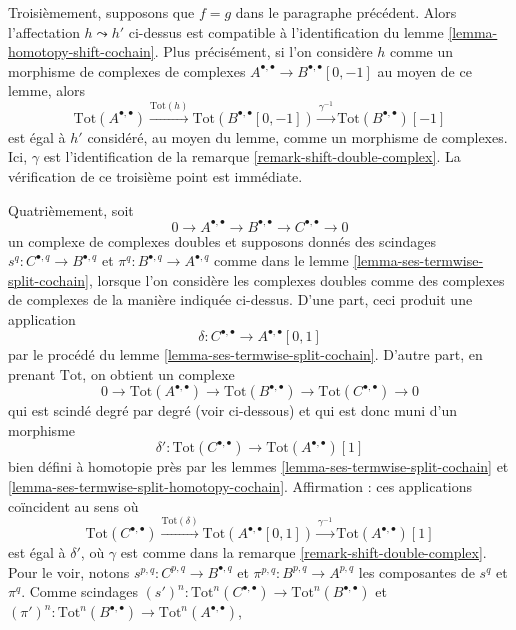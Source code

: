 \begin{remark}
\medskip\noindent
Troisièmement, supposons que $f = g$ dans le paragraphe précédent.
Alors l'affectation $h \leadsto h'$ ci-dessus est compatible à
l'identification du lemme \ref{lemma-homotopy-shift-cochain}.
Plus précisément, si l'on considère $h$ comme un morphisme de complexes
de complexes $A^{\bullet, \bullet} \to B^{\bullet, \bullet}[0, -1]$
au moyen de ce lemme, alors
$$
\text{Tot}(A^{\bullet, \bullet})
\xrightarrow{\text{Tot}(h)}
\text{Tot}(B^{\bullet, \bullet}[0, -1])
\xrightarrow{\gamma^{-1}}
\text{Tot}(B^{\bullet, \bullet})[-1]
$$
est égal à $h'$ considéré, au moyen du lemme, comme un morphisme de complexes.
Ici, $\gamma$ est l'identification de la
remarque \ref{remark-shift-double-complex}.
La vérification de ce troisième point est immédiate.

\medskip\noindent
Quatrièmement, soit
$$
0 \to A^{\bullet, \bullet} \to B^{\bullet, \bullet} \to
C^{\bullet, \bullet} \to 0
$$
un complexe de complexes doubles et supposons donnés des scindages
$s^q : C^{\bullet, q} \to B^{\bullet, q}$ et
$\pi^q : B^{\bullet, q} \to A^{\bullet, q}$
comme dans le lemme \ref{lemma-ses-termwise-split-cochain},
lorsque l'on considère les complexes doubles
comme des complexes de complexes de la manière indiquée ci-dessus.
D'une part, ceci produit une application
$$
\delta : C^{\bullet, \bullet} \longrightarrow A^{\bullet, \bullet}[0, 1]
$$
par le procédé du lemme \ref{lemma-ses-termwise-split-cochain}.
D'autre part, en prenant $\text{Tot}$, on obtient un complexe
$$
0 \to \text{Tot}(A^{\bullet, \bullet}) \to
\text{Tot}(B^{\bullet, \bullet}) \to
\text{Tot}(C^{\bullet, \bullet}) \to 0
$$
qui est scindé degré par degré (voir ci-dessous) et qui est donc muni d'un morphisme
$$
\delta' :
\text{Tot}(C^{\bullet, \bullet})
\longrightarrow
\text{Tot}(A^{\bullet, \bullet})[1]
$$
bien défini à homotopie près par les lemmes \ref{lemma-ses-termwise-split-cochain}
et \ref{lemma-ses-termwise-split-homotopy-cochain}. Affirmation :
ces applications coïncident au sens où
$$
\text{Tot}(C^{\bullet, \bullet})
\xrightarrow{\text{Tot}(\delta)}
\text{Tot}(A^{\bullet, \bullet}[0, 1]) \xrightarrow{\gamma^{-1}}
\text{Tot}(A^{\bullet, \bullet})[1]
$$
est égal à $\delta'$, où $\gamma$ est comme dans la
remarque \ref{remark-shift-double-complex}. Pour le voir, notons
$s^{p, q} : C^{p, q} \to B^{\bullet, q}$ et
$\pi^{p, q} : B^{p, q} \to A^{p, q}$ les composantes de $s^q$ et $\pi^q$.
Comme scindages
$(s')^n : \text{Tot}^n(C^{\bullet, \bullet}) \to
\text{Tot}^n(B^{\bullet, \bullet})$
et
$(\pi')^n : \text{Tot}^n(B^{\bullet, \bullet}) \to
\text{Tot}^n(A^{\bullet, \bullet})$,

\end{remark}
